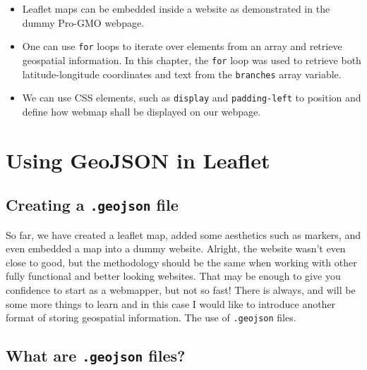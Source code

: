 \documentclass[
]{book}
\begin{document}
\begin{itemize}
\item
  Leaflet maps can be embedded inside a website as demonstrated in the dummy Pro-GMO webpage.
\item
  One can use \texttt{for} loops to iterate over elements from an array and retrieve geospatial information. In this chapter, the \texttt{for} loop was used to retrieve both latitude-longitude coordinates and text from the \texttt{branches} array variable.
\item
  We can use CSS elements, such as \texttt{display} and \texttt{padding-left} to position and define how webmap shall be displayed on our webpage.
\end{itemize}

\hypertarget{using-geojson-in-leaflet}{%
\chapter{Using GeoJSON in Leaflet}\label{using-geojson-in-leaflet}}

\hypertarget{creating-a-.geojson-file}{%
\section{\texorpdfstring{Creating a \texttt{.geojson} file}{Creating a .geojson file}}\label{creating-a-.geojson-file}}

So far, we have created a leaflet map, added some aesthetics such as markers, and even embedded a map into a dummy website. Alright, the website wasn't even close to good, but the methodology should be the same when working with other fully functional and better looking websites. That may be enough to give you confidence to start as a webmapper, but not so fast! There is always, and will be some more things to learn and in this case I would like to introduce another format of storing geospatial information. The use of \texttt{.geojson} files.

\hypertarget{what-are-.geojson-files}{%
\section{\texorpdfstring{What are \texttt{.geojson} files?}{What are .geojson files?}}\label{what-are-.geojson-files}}
\end{document}
